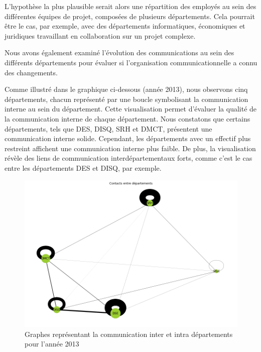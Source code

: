 \documentclass{article}
\begin{document}
L'hypothèse la plus plausible serait alors une répartition des employés au sein des différentes équipes de projet, composées de plusieurs départements. Cela pourrait être le cas, par exemple, avec des départements informatiques, économiques et juridiques travaillant en collaboration sur un projet complexe.


Nous avons également examiné l'évolution des communications au sein des différents départements pour évaluer si l'organisation communicationnelle a connu des changements.

Comme illustré dans le graphique ci-dessous (année 2013), nous observons cinq départements, chacun représenté par une boucle symbolisant la communication interne au sein du département. Cette visualisation permet d'évaluer la qualité de la communication interne de chaque département. Nous constatons que certains départements, tels que DES, DISQ, SRH et DMCT, présentent une communication interne solide. Cependant, les départements avec un effectif plus restreint affichent une communication interne plus faible. De plus, la visualisation révèle des liens de communication interdépartementaux forts, comme c'est le cas entre les départements DES et DISQ, par exemple.

\begin{figure}[h]
    \centering
    \includegraphics[width=16.4cm]{assets/communaute/communaute_communication_2013.png}
    \caption{Graphes représentant la communication inter et intra départements pour l'année 2013}
    \label{fig:communaute_communication_2013}
\end{figure}
\end{document}
